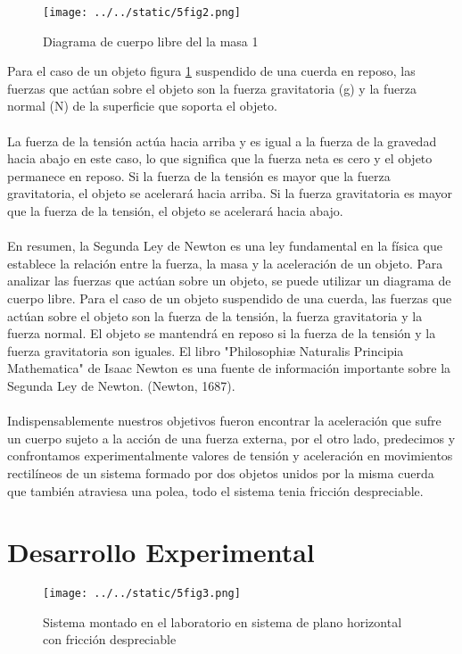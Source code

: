 \documentclass{article}
\begin{document}
\begin{multicols}{2}
\begin{figure}[H]
	\centering
	\texttt{[image: ../../static/5fig2.png]}
	\caption{Diagrama de cuerpo libre del la masa 1}
	\label{fig:2}
\end{figure}
Para el caso de un objeto figura \ref*{fig:2} suspendido de una cuerda en reposo, las fuerzas que actúan sobre el objeto son la fuerza gravitatoria (g) y la fuerza normal (N) de la superficie que soporta el objeto.
\\
\\
La fuerza de la tensión actúa hacia arriba y es igual a la fuerza de la gravedad hacia abajo en este caso, lo que significa que la fuerza neta es cero y el objeto permanece en reposo. Si la fuerza de la tensión es mayor que la fuerza gravitatoria, el objeto se acelerará hacia arriba. Si la fuerza gravitatoria es mayor que la fuerza de la tensión, el objeto se acelerará hacia abajo.
\\
\\
En resumen, la Segunda Ley de Newton es una ley fundamental en la física que establece la relación entre la fuerza, la masa y la aceleración de un objeto. Para analizar las fuerzas que actúan sobre un objeto, se puede utilizar un diagrama de cuerpo libre. Para el caso de un objeto suspendido de una cuerda, las fuerzas que actúan sobre el objeto son la fuerza de la tensión, la fuerza gravitatoria y la fuerza normal. El objeto se mantendrá en reposo si la fuerza de la tensión y la fuerza gravitatoria son iguales. El libro "Philosophiæ Naturalis Principia Mathematica" de Isaac Newton es una fuente de información importante sobre la Segunda Ley de Newton. (Newton, 1687).
\\
\\
Indispensablemente nuestros objetivos fueron encontrar la aceleración que sufre un cuerpo sujeto a la acción de una fuerza
externa, por el otro lado, predecimos y confrontamos experimentalmente valores de tensión y aceleración en movimientos rectilíneos
de un sistema formado por dos objetos unidos por la misma cuerda que también atraviesa una polea, todo el sistema tenia fricción despreciable.

\section*{Desarrollo Experimental}\label{Desarrollo experimental}				%

\begin{figure}[H]
	\centering
	\texttt{[image: ../../static/5fig3.png]}
	\caption*{Sistema montado en el laboratorio en sistema de plano horizontal con fricción despreciable}
	\label{fig:3}
\end{figure}


\end{multicols}
\end{document}
